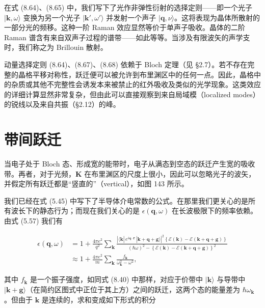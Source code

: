 在式 (8.64)、(8.65) 中，我们写下了光作非弹性衍射的选择定则——即一个光子 $|\mathbf{k},\omega\rangle$ 变换为另一个光子 $|\mathbf{k}',\omega'\rangle$ 并发射一个声子 $|\mathbf{q},\nu\rangle$。这将表现为晶体所散射的一部分光的频移。这种一阶 Raman 效应显然等价于单声子吸收。晶体的二阶 Raman 谱含有来自双声子过程的谱带——如此等等。当涉及有限波矢的声学支时，我们称之为 Brillouin 散射。

动量选择定则 (8.64)、(8.67)、(8.68) 依赖于 Bloch 定理（见 §2.7）。若不存在完整的晶格平移对称性，跃迁便可以被允许到布里渊区中的任何一点。因此，晶格中的杂质或其他不完整性会诱发本来被禁止的红外吸收及类似的光学现象。这类效应的详细计算显然非常复杂，但由此可以直接观察到来自局域模（localized modes）的锐线以及来自共振（§2.12）的峰。

\section{带间跃迁}

当电子处于 Bloch 态、形成宽的能带时，电子从满态到空态的跃迁产生宽的吸收带。再者，对于光频，$\mathbf{K}$ 在布里渊区的尺度上很小，因此可以忽略光子的波矢，并假定所有跃迁都是“竖直的”（vertical），如图 143 所示。


我们已经在式 (5.45) 中写下了半导体介电常数的公式。在那里我们更关心的是所有波长下的静态行为；而现在我们关心的是 $\epsilon(\mathbf{q},\omega)$ 在长波极限下的频率依赖。由式 (5.57) 我们有

\begin{align*}
\epsilon(\mathbf{q},\omega) &= 1 + \frac{4\pi e^2}{q^2} \sum_{\mathbf{k}} \frac{\left|\langle\mathbf{k}|\,e^{i\mathbf{q}\cdot\mathbf{r}}\,|\mathbf{k}+\mathbf{q}+\mathbf{g}\rangle\right|^2 \left\{\mathcal{E}(\mathbf{k})-\mathcal{E}(\mathbf{k}+\mathbf{q}+\mathbf{g})\right\}}{(\hbar\omega)^2-\left\{\mathcal{E}(\mathbf{k})-\mathcal{E}(\mathbf{k}+\mathbf{q}+\mathbf{g})\right\}^2} \\
&\approx 1 + \frac{4\pi e^2}{m} \sum_{\mathbf{k}} \frac{f_{\mathbf{k}}}{\omega_{\mathbf{k}}^2-\omega^2},
\tag{8.71}
\end{align*}

其中 $f_{\mathbf{k}}$ 是一个振子强度，如同式 (8.40) 中那样，对应于价带中 $|\mathbf{k}\rangle$ 与导带中 $|\mathbf{k}+\mathbf{g}\rangle$（在简约区图式中正位于其上方）之间的跃迁，这两个态的能量差为 $\hbar\omega_{\mathbf{k}}$。但由于 $\mathbf{k}$ 是连续的，求和变成如下形式的积分

